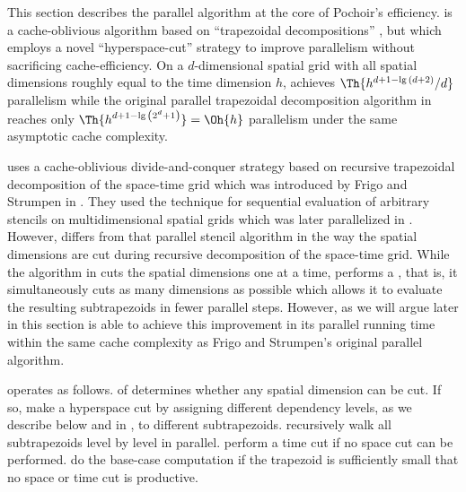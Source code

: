 
\newtheorem{mydef}{Definition}

This section describes the parallel algorithm  at the core
of Pochoir's efficiency.   is a cache-oblivious algorithm
based on ``trapezoidal decompositions'' \cite{FrigoSt05, FrigoSt09},
but which employs a novel ``hyperspace-cut'' strategy to
improve parallelism without sacrificing cache-efficiency.
On a $d$-dimensional spatial grid with all spatial dimensions
roughly equal to the time dimension $h$, 
achieves $\Th{ h^{ d + 1 - \lg{ \left( d + 2 \right) } } / d }$ parallelism
while the original parallel trapezoidal decomposition
algorithm in \cite{FrigoSt09} reaches only
$\Th{ h^{ d + 1 - \lg{ \left( 2^d + 1 \right) } } } = \Oh{ h }$
parallelism under the same asymptotic cache complexity.

 uses a cache-oblivious \cite{FrigoLePr99}
divide-and-conquer strategy based on recursive trapezoidal
decomposition of the space-time grid which was introduced by Frigo and
Strumpen in \cite{FrigoSt05}. They used the technique for sequential
evaluation of arbitrary stencils on multidimensional spatial grids
which was later parallelized in \cite{FrigoSt09}. However, 
differs from that parallel stencil algorithm 
in the way the spatial dimensions are cut
during recursive decomposition of the space-time grid.
%
While the algorithm in \cite{FrigoSt09} cuts the spatial dimensions
one at a time,  performs a 
, that is, it
simultaneously cuts as many
dimensions as possible which allows it to evaluate
the resulting subtrapezoids in fewer parallel steps. 
%
However, as we will argue later in this section
 is able to achieve this improvement
in its parallel running time within the same 
cache complexity as Frigo and Strumpen's original
parallel algorithm.

 operates as follows.   of 
determines whether any spatial dimension can be cut.  If so,
 make a hyperspace cut by assigning 
different dependency levels, as we describe below and in
, to different subtrapezoids.
 recursively walk all
subtrapezoids level by level in parallel.
 perform a time cut if no space
cut can be performed.  do the
base-case computation if the trapezoid is sufficiently small that no
space or time cut is productive.

